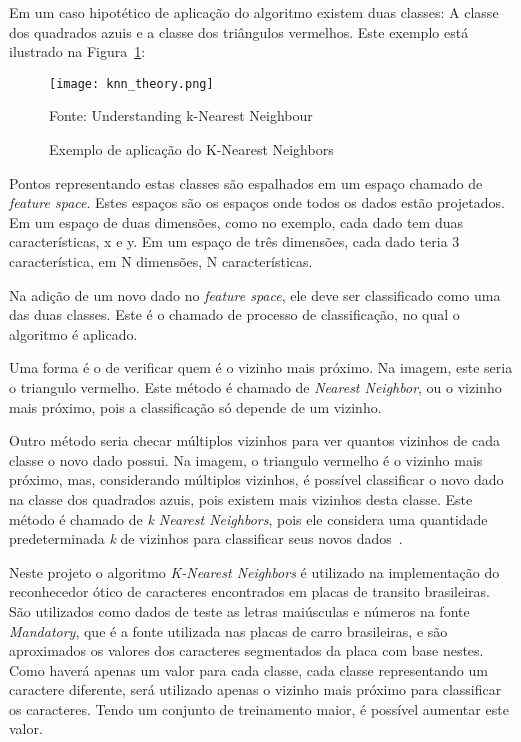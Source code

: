 Em um caso hipotético de aplicação do algoritmo existem duas classes: A classe dos quadrados azuis e a classe dos triângulos vermelhos. Este exemplo está ilustrado na Figura~\ref{fig:knearest_example}:

\begin{figure}[H]
	\centering
	\texttt{[image: knn\_theory.png]}
	\caption{Exemplo de aplicação do K-Nearest Neighbors}
Fonte: Understanding k-Nearest Neighbour~\cite{opencv2014knearest}
	\label{fig:knearest_example}
\end{figure}

Pontos representando estas classes são espalhados em um espaço chamado de \emph{feature space}. Estes espaços são os espaços onde todos os dados estão projetados. Em um espaço de duas dimensões, como no exemplo, cada dado tem duas características, x e y. Em um espaço de três dimensões, cada dado teria 3 característica, em N dimensões, N características.

Na adição de um novo dado no \emph{feature space}, ele deve ser classificado como uma das duas classes. Este é o chamado de processo de classificação, no qual o algoritmo é aplicado.

Uma forma é o de verificar quem é o vizinho mais próximo. Na imagem, este seria o triangulo vermelho. Este método é chamado de \emph{Nearest Neighbor}, ou o vizinho mais próximo, pois a classificação só depende de um vizinho.

Outro método seria checar múltiplos vizinhos para ver quantos vizinhos de cada classe o novo dado possui. Na imagem, o triangulo vermelho é o vizinho mais próximo, mas, considerando múltiplos vizinhos, é possível classificar o novo dado na classe dos quadrados azuis, pois existem mais vizinhos desta classe. Este método é chamado de \emph{k Nearest Neighbors}, pois ele considera uma quantidade predeterminada \emph{k} de vizinhos para classificar seus novos dados~\cite{opencv2014knearest}.

Neste projeto o algoritmo \emph{K-Nearest Neighbors} é utilizado na implementação do reconhecedor ótico de caracteres encontrados em placas de transito brasileiras. São utilizados como dados de teste as letras maiúsculas e números na fonte \emph{Mandatory}, que é a fonte utilizada nas placas de carro brasileiras, e são aproximados os valores dos caracteres segmentados da placa com base nestes. Como haverá apenas um valor para cada classe, cada classe representando um caractere diferente, será utilizado apenas o vizinho mais próximo para classificar os caracteres. Tendo um conjunto de treinamento maior, é possível aumentar este valor.
 